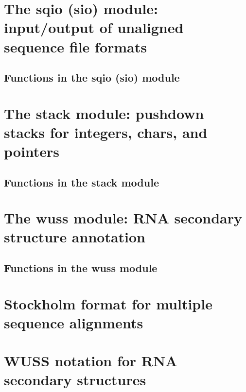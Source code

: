 \documentclass[11pt]{article}
\begin{document}
\newpage
\section{The sqio (sio) module: input/output of unaligned sequence file formats}

\subsection{Functions in the sqio (sio) module}


\newpage
\section{The stack module: pushdown stacks for integers, chars, and pointers}

\subsection{Functions in the stack module}


\newpage
\section{The wuss module: RNA secondary structure annotation}

\subsection{Functions in the wuss module}


\newpage
\section{Stockholm format for multiple sequence alignments}


\newpage
\section{WUSS notation for RNA secondary structures}


\newpage
\newcommand{\bibfont}{\footnotesize}


\end{document}
